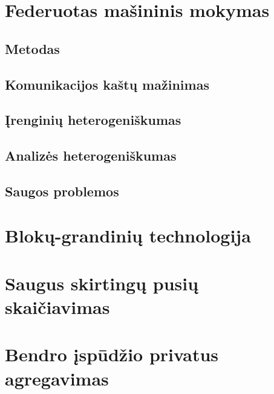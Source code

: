 \documentclass{VUMIFInfBakalaurinis}
\begin{document}
\section{Federuotas mašininis mokymas}
\subsection{Metodas}
\subsection{Komunikacijos kaštų mažinimas}
\subsection{Įrenginių heterogeniškumas}
\subsection{Analizės heterogeniškumas}
\subsection{Saugos problemos}

\section{Blokų-grandinių technologija}

\section{Saugus skirtingų pusių skaičiavimas}

\section{Bendro įspūdžio privatus agregavimas}




\printbibliography[heading=bibintoc]
\end{document}
